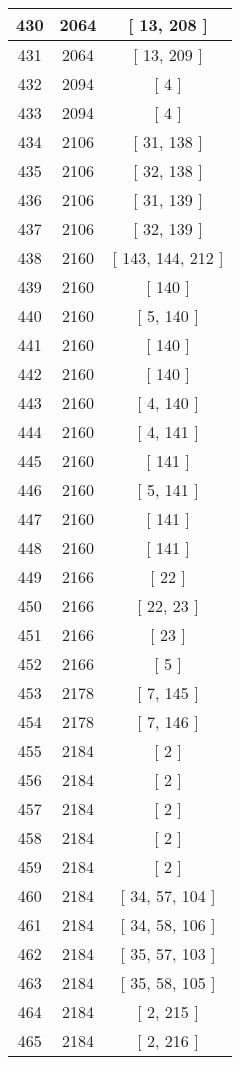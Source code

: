 \begin{center}
\begin{longtable}[H]{|| c c c ||}
\hline
430 & 2064 & [ 13, 208 ] \\ 
\hline
431 & 2064 & [ 13, 209 ] \\ 
\hline
432 & 2094 & [ 4 ] \\ 
\hline
433 & 2094 & [ 4 ] \\ 
\hline
434 & 2106 & [ 31, 138 ] \\ 
\hline
435 & 2106 & [ 32, 138 ] \\ 
\hline
436 & 2106 & [ 31, 139 ] \\ 
\hline
437 & 2106 & [ 32, 139 ] \\ 
\hline
438 & 2160 & [ 143, 144, 212 ] \\ 
\hline
439 & 2160 & [ 140 ] \\ 
\hline
440 & 2160 & [ 5, 140 ] \\ 
\hline
441 & 2160 & [ 140 ] \\ 
\hline
442 & 2160 & [ 140 ] \\ 
\hline
443 & 2160 & [ 4, 140 ] \\ 
\hline
444 & 2160 & [ 4, 141 ] \\ 
\hline
445 & 2160 & [ 141 ] \\ 
\hline
446 & 2160 & [ 5, 141 ] \\ 
\hline
447 & 2160 & [ 141 ] \\ 
\hline
448 & 2160 & [ 141 ] \\ 
\hline
449 & 2166 & [ 22 ] \\ 
\hline
450 & 2166 & [ 22, 23 ] \\ 
\hline
451 & 2166 & [ 23 ] \\ 
\hline
452 & 2166 & [ 5 ] \\ 
\hline
453 & 2178 & [ 7, 145 ] \\ 
\hline
454 & 2178 & [ 7, 146 ] \\ 
\hline
455 & 2184 & [ 2 ] \\ 
\hline
456 & 2184 & [ 2 ] \\ 
\hline
457 & 2184 & [ 2 ] \\ 
\hline
458 & 2184 & [ 2 ] \\ 
\hline
459 & 2184 & [ 2 ] \\ 
\hline
460 & 2184 & [ 34, 57, 104 ] \\ 
\hline
461 & 2184 & [ 34, 58, 106 ] \\ 
\hline
462 & 2184 & [ 35, 57, 103 ] \\ 
\hline
463 & 2184 & [ 35, 58, 105 ] \\ 
\hline
464 & 2184 & [ 2, 215 ] \\ 
\hline
465 & 2184 & [ 2, 216 ] \\ 

\end{longtable}
\end{center}
